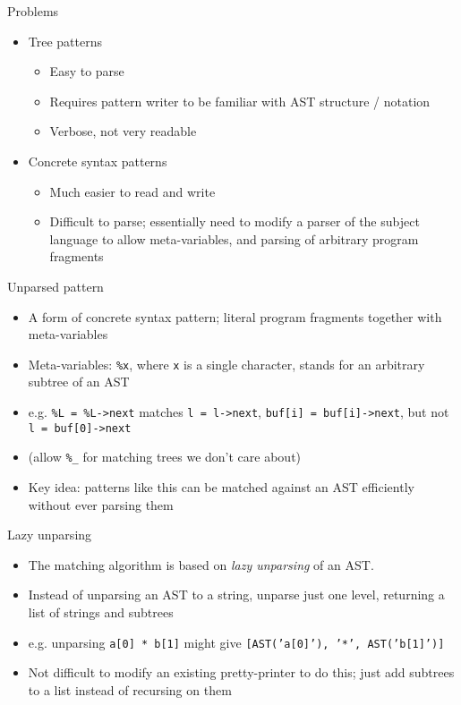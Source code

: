 \documentclass{beamer}
\begin{document}
\begin{frame}{Problems}
\begin{itemize}
\item Tree patterns
\begin{itemize}
\item Easy to parse
\item Requires pattern writer to be familiar with AST structure / notation
\item Verbose, not very readable
\end{itemize}
\item Concrete syntax patterns
\begin{itemize}
\item Much easier to read and write
\item Difficult to parse; essentially need to modify a parser of the
subject language to allow meta-variables, and parsing of arbitrary program
fragments
\end{itemize}
\end{itemize}
\end{frame}

\begin{frame}{Unparsed pattern}
\begin{itemize}
\item A form of concrete syntax pattern; literal program fragments together
with meta-variables
\item Meta-variables: {\tt \%x}, where {\tt x} is a single character, stands
for an arbitrary subtree of an AST
\item e.g. {\tt \%L = \%L->next} matches {\tt l = l->next}, {\tt buf[i] = buf[i]->next}, but not {\tt l = buf[0]->next}
\item (allow {\tt \%\_} for matching trees we don't care about)
\item Key idea: patterns like this can be matched against an AST efficiently without ever parsing them
\end{itemize}
\end{frame}

\begin{frame}{Lazy unparsing}
\begin{itemize}
\item The matching algorithm is based on \emph{lazy unparsing} of an AST.
\item Instead of unparsing an AST to a string, unparse just one level,
returning a list of strings and subtrees
\item e.g. unparsing {\tt a[0] * b[1]} might give
{\tt [AST('a[0]'), '*', AST('b[1]')]}
\item Not difficult to modify an existing pretty-printer to do this; just
add subtrees to a list instead of recursing on them
\end{itemize}
\end{frame}
\end{document}
